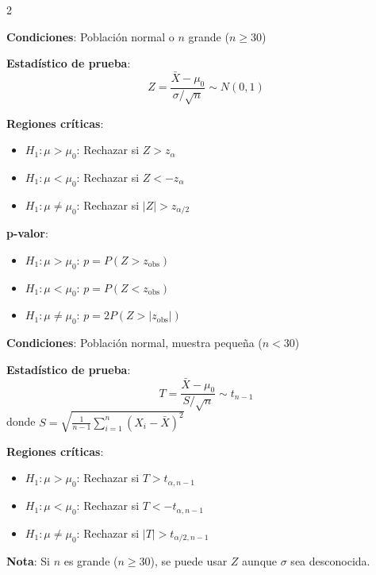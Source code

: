\documentclass[10pt,a4paper]{article}
\begin{document}

\begin{multicols}{2}
    \begin{tcolorbox}[title=Caso 1: Varianza conocida $\sigma^2$, equal height group=CH3]
        \textbf{Condiciones}: Población normal o $n$ grande ($n \geq 30$)
        
        \textbf{Estadístico de prueba}:
        \[
            Z = \frac{\bar{X} - \mu_0}{\sigma/\sqrt{n}} \sim N(0,1)
        \]
        
        \textbf{Regiones críticas}:
        \begin{itemize}
            \item $H_1: \mu > \mu_0$: Rechazar si $Z > z_\alpha$
            \item $H_1: \mu < \mu_0$: Rechazar si $Z < -z_\alpha$
            \item $H_1: \mu \neq \mu_0$: Rechazar si $|Z| > z_{\alpha/2}$
        \end{itemize}
        
        \textbf{p-valor}:
        \begin{itemize}
            \item $H_1: \mu > \mu_0$: $p = P(Z > z_{\text{obs}})$
            \item $H_1: \mu < \mu_0$: $p = P(Z < z_{\text{obs}})$
            \item $H_1: \mu \neq \mu_0$: $p = 2P(Z > |z_{\text{obs}}|)$
        \end{itemize}
    \end{tcolorbox}
    \begin{tcolorbox}[title=Caso 2: Varianza desconocida, equal height group=CH3]
        \textbf{Condiciones}: Población normal, muestra pequeña ($n < 30$)
        
        \textbf{Estadístico de prueba}:
        \[
            T = \frac{\bar{X} - \mu_0}{S/\sqrt{n}} \sim t_{n-1}
        \]
        donde $S = \sqrt{\frac{1}{n-1}\sum_{i=1}^n (X_i - \bar{X})^2}$
        
        \textbf{Regiones críticas}:
        \begin{itemize}
            \item $H_1: \mu > \mu_0$: Rechazar si $T > t_{\alpha, n-1}$
            \item $H_1: \mu < \mu_0$: Rechazar si $T < -t_{\alpha, n-1}$
            \item $H_1: \mu \neq \mu_0$: Rechazar si $|T| > t_{\alpha/2, n-1}$
        \end{itemize}
        
        \textbf{Nota}: Si $n$ es grande ($n \geq 30$), se puede usar $Z$ aunque $\sigma$ sea desconocida.
    \end{tcolorbox}
\end{multicols}
\end{document}
